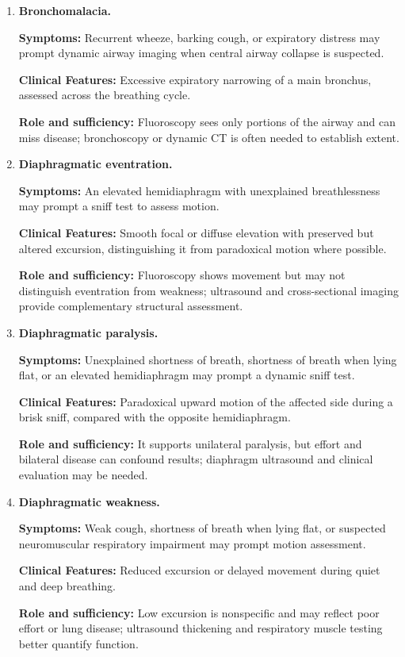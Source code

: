 \begin{enumerate}[leftmargin=*,itemsep=0.45em,topsep=0.4em]
\item \textbf{Bronchomalacia.}\par\noindent\textbf{Symptoms:} Recurrent wheeze, barking cough, or expiratory distress may prompt dynamic airway imaging when central airway collapse is suspected.\par\noindent\textbf{Clinical Features:} Excessive expiratory narrowing of a main bronchus, assessed across the breathing cycle.\par\noindent\textbf{Role and sufficiency:} Fluoroscopy sees only portions of the airway and can miss disease; bronchoscopy or dynamic CT is often needed to establish extent.
\item \textbf{Diaphragmatic eventration.}\par\noindent\textbf{Symptoms:} An elevated hemidiaphragm with unexplained breathlessness may prompt a sniff test to assess motion.\par\noindent\textbf{Clinical Features:} Smooth focal or diffuse elevation with preserved but altered excursion, distinguishing it from paradoxical motion where possible.\par\noindent\textbf{Role and sufficiency:} Fluoroscopy shows movement but may not distinguish eventration from weakness; ultrasound and cross-sectional imaging provide complementary structural assessment.
\item \textbf{Diaphragmatic paralysis.}\par\noindent\textbf{Symptoms:} Unexplained shortness of breath, shortness of breath when lying flat, or an elevated hemidiaphragm may prompt a dynamic sniff test.\par\noindent\textbf{Clinical Features:} Paradoxical upward motion of the affected side during a brisk sniff, compared with the opposite hemidiaphragm.\par\noindent\textbf{Role and sufficiency:} It supports unilateral paralysis, but effort and bilateral disease can confound results; diaphragm ultrasound and clinical evaluation may be needed.
\item \textbf{Diaphragmatic weakness.}\par\noindent\textbf{Symptoms:} Weak cough, shortness of breath when lying flat, or suspected neuromuscular respiratory impairment may prompt motion assessment.\par\noindent\textbf{Clinical Features:} Reduced excursion or delayed movement during quiet and deep breathing.\par\noindent\textbf{Role and sufficiency:} Low excursion is nonspecific and may reflect poor effort or lung disease; ultrasound thickening and respiratory muscle testing better quantify function.

\end{enumerate}
